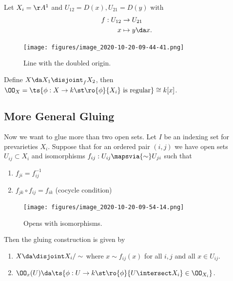 \begin{example}

Let \(X_i = \AA^1\) and \(U_{12} = D(x), U_{21} = D(y)\) with
\begin{align*}  
f: U_{12} &\to U_{21} \\
x &\mapsto y\da x
.\end{align*}

\begin{figure}
\centering
\texttt{[image: figures/image\_2020-10-20-09-44-41.png]}
\caption{Line with the doubled origin.}
\end{figure}

Define \(X\da X_1 \disjoint_f X_2\), then
\(\OO_X = \ts{\phi: X\to k \st \ro{\phi}{X_i} \text{ is regular}} \cong k[x]\).

\end{example}

\hypertarget{more-general-gluing}{%
\subsection{More General Gluing}\label{more-general-gluing}}

Now we want to glue more than two open sets. Let \(I\) be an indexing
set for prevarieties \(X_i\). Suppose that for an ordered pair
\((i, j)\) we have open sets \(U_{ij} \subset X_i\) and isomorphisms
\(f_{ij}: U_{ij} \mapsvia{\sim} U_{ji}\) such that

\begin{enumerate}
\def\labelenumi{\alph{enumi}.}
\item
  \(f_{ji} = f_{ij}^{-1}\)
\item
  \(f_{jk} \circ f_{ij} = f_{ik}\) (cocycle condition)
\end{enumerate}

\begin{figure}
\centering
\texttt{[image: figures/image\_2020-10-20-09-54-14.png]}
\caption{Opens with isomorphisms.}
\end{figure}

Then the gluing construction is given by

\begin{enumerate}
\def\labelenumi{\arabic{enumi}.}
\item
  \(X\da \disjoint X_i/\sim\) where \(x\sim f_{ij}(x)\) for all \(i,j\)
  and all \(x\in U_{ij}\).
\item
  \(\OO_x(U) \da \ts{\phi:U\to k \st \ro{\phi}{U\intersect X_i} \in \OO_{X_i} }\).
\end{enumerate}

